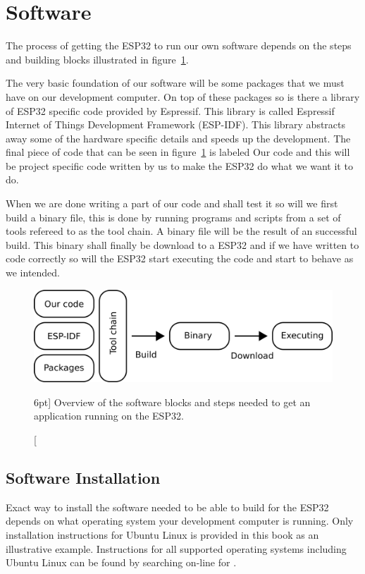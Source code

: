 \documentclass{tufte-book}
\begin{document}
\section{Software}\label{sec:software}

The process of getting the ESP32 to run our own software depends on the steps and building blocks illustrated in figure~\ref{fig:software_anatomy}.

The very basic foundation of our software will be some packages that we must have on our development computer. On top of these packages so is there a library of ESP32 specific code provided by Espressif. This library is called Espressif Internet of Things Development Framework (ESP-IDF). This library abstracts away some of the hardware specific details and speeds up the development. The final piece of code that can be seen in figure~\ref{fig:software_anatomy} is labeled Our code and this will be project specific code written by us to make the ESP32 do what we want it to do.

When we are done writing a part of our code and shall test it so will we first build a binary file, this is done by running programs and scripts from a set of tools refereed to as the tool chain. A binary file will be the result of an successful build. This binary shall finally be download to a ESP32 and if we have written to code correctly so will the ESP32 start executing the code and start to behave as we intended. 

\begin{figure}
	\includegraphics[scale=1.0]{software_anatomy.png}
	\caption[Software development $n$.][6pt]{
	Overview of the software blocks and steps needed to get an application
	running on the ESP32.
	}
	\label{fig:software_anatomy}
\end{figure}

\subsection{Software Installation}
Exact way to install the software needed to be able to build for the ESP32 depends on what operating system your development computer is running.
Only installation instructions for Ubuntu Linux is provided in this book as an illustrative example. Instructions for all supported operating systems including Ubuntu Linux can be found by searching on-line for .
\end{document}
